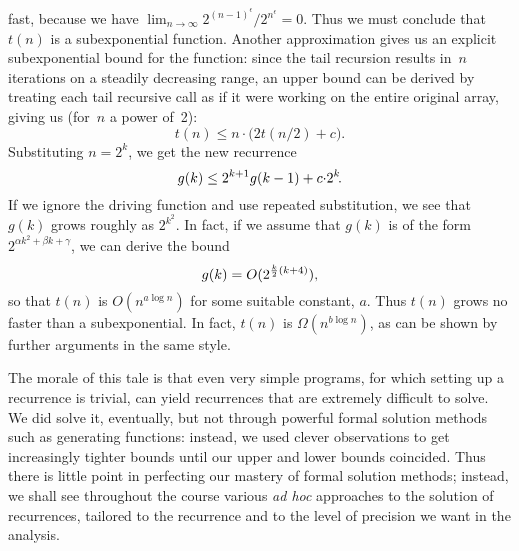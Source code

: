 \documentclass{article}
\begin{document}
fast, because we have
$\lim_{n\to\infty} 2^{(n-1)^{\epsilon}}/2^{n^{\epsilon}} = 0$.
Thus we must conclude that $t(n)$ is a subexponential function.
Another approximation gives us an explicit subexponential bound for
the function: since the tail recursion results in~$n$ iterations on a steadily
decreasing range, an upper bound can be derived by treating each tail
recursive call as if it were working on the entire original array, giving us
(for~$n$ a power of~2):
\begin{displaymath}
  t(n) \leq n {\cdot} \bigl( 2t(n/2)+c \bigr).
\end{displaymath}
Substituting $n=2^k$\negthinspace, we get the new recurrence
\begin{displaymath}
  g(k) \leq 2^{k+1} g(k-1) + c {\cdot} 2^k\negthinspace.
\end{displaymath}
If we ignore the driving function and use repeated substitution, we see that
$g(k)$ grows roughly as $2^{k^2}$\negthinspace.
In fact, if we assume that $g(k)$ is of the
form $2^{\alpha k^2 + \beta k + \gamma}$\negthinspace, we can derive the bound
\begin{displaymath}
  g(k) = O(2^{{k \over 2}(k+4)}),
\end{displaymath}
so that $t(n)$ is $O(n^{a \log n})$ for some suitable constant, $a$.
Thus $t(n)$ grows no faster than a subexponential.
In fact, $t(n)$ is $\Omega(n^{b \log n})$, as can be shown by further
arguments in the same style.

The morale of this tale is that even very simple programs, for which setting
up a recurrence is trivial, can yield recurrences that are extremely difficult
to solve.  We did solve it, eventually, but not through powerful formal
solution methods such as generating functions: instead, we used clever
observations to get increasingly tighter bounds until our upper and lower
bounds coincided.  Thus there is little point in perfecting our mastery of
formal solution methods; instead, we shall see throughout the course various
\emph{ad hoc} approaches to the solution of recurrences, tailored to the
recurrence and to the level of precision we want in the analysis.
\end{document}

